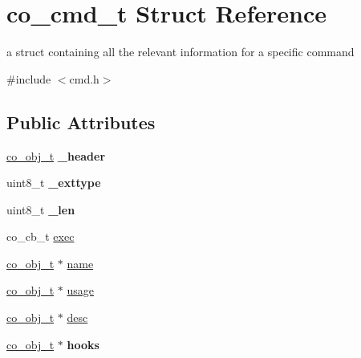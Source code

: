\hypertarget{structco__cmd__t}{\section{co\+\_\+cmd\+\_\+t Struct Reference}
\label{structco__cmd__t}
}


a struct containing all the relevant information for a specific command  




{\ttfamily \#include $<$cmd.\+h$>$}

\subsection*{Public Attributes}
\begin{DoxyCompactItemize}
\item 
\hypertarget{structco__cmd__t_a1eba06f28ef80ce205820ca7ea9dcb67}{\hyperlink{structco__obj__t}{co\+\_\+obj\+\_\+t} {\bfseries \+\_\+header}}\label{structco__cmd__t_a1eba06f28ef80ce205820ca7ea9dcb67}

\item 
\hypertarget{structco__cmd__t_abe94d4588c6c8774cc9a75d2efb738e3}{uint8\+\_\+t {\bfseries \+\_\+exttype}}\label{structco__cmd__t_abe94d4588c6c8774cc9a75d2efb738e3}

\item 
\hypertarget{structco__cmd__t_a71186cf41b095172ec843be31ad8b5e8}{uint8\+\_\+t {\bfseries \+\_\+len}}\label{structco__cmd__t_a71186cf41b095172ec843be31ad8b5e8}

\item 
co\+\_\+cb\+\_\+t \hyperlink{structco__cmd__t_add04e691f5afa12a19ecc870860d9e82}{exec}
\item 
\hyperlink{structco__obj__t}{co\+\_\+obj\+\_\+t} $\ast$ \hyperlink{structco__cmd__t_ab6400b20e7ea4d71d79c421f57b18862}{name}
\item 
\hyperlink{structco__obj__t}{co\+\_\+obj\+\_\+t} $\ast$ \hyperlink{structco__cmd__t_af73f4d544979225b4f5ef4fe22f855ef}{usage}
\item 
\hyperlink{structco__obj__t}{co\+\_\+obj\+\_\+t} $\ast$ \hyperlink{structco__cmd__t_a97bb000840489763d726b1e81181a5f5}{desc}
\item 
\hypertarget{structco__cmd__t_ae13fb886b0c6932634d8891af7d874ec}{\hyperlink{structco__obj__t}{co\+\_\+obj\+\_\+t} $\ast$ {\bfseries hooks}}\label{structco__cmd__t_ae13fb886b0c6932634d8891af7d874ec}

\end{DoxyCompactItemize}



